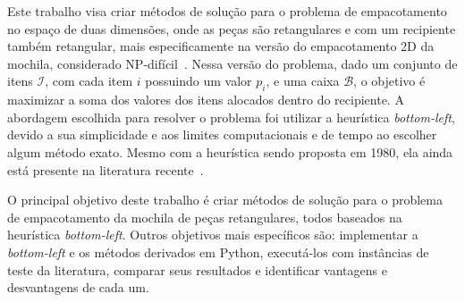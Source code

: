 Este trabalho visa criar métodos de solução para o problema de empacotamento no espaço de duas
dimensões, onde as peças
são retangulares e com um recipiente também retangular, mais especificamente na versão do
empacotamento 2D da mochila, considerado NP-difícil~\cite{2DPackLib}.
Nessa versão do problema, dado um conjunto de itens $\mathcal{I}$, com cada item $i$ possuindo um
valor $p_i$, e uma caixa $\mathcal{B}$, o objetivo é maximizar a soma dos valores dos itens alocados
dentro do recipiente.
A abordagem escolhida para resolver o problema foi utilizar a heurística \textit{bottom-left},
devido a sua simplicidade e aos limites computacionais e de tempo ao escolher algum método exato.
Mesmo com a heurística sendo proposta em 1980, ela ainda está presente
na literatura recente~\cite{chehrazad2022fast,hopper2001empirical,wei2011skyline}.

O principal objetivo deste trabalho é criar métodos de solução para o problema de
empacotamento da mochila de peças retangulares, todos baseados na heurística \textit{bottom-left}.
Outros objetivos mais específicos são: implementar a \textit{bottom-left} e os métodos derivados em
Python, executá-los com instâncias de teste da literatura, comparar seus resultados e identificar
vantagens e desvantagens de cada um.
